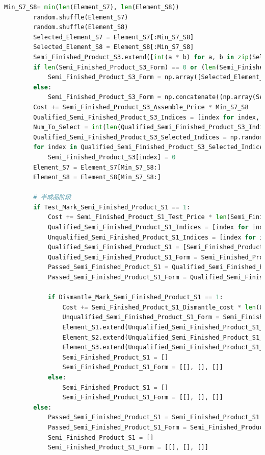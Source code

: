 \documentclass[withoutpreface,bwprint]{cumcmthesis} %
\begin{document}
\begin{appendices}
\begin{lstlisting}[language=python]
		Min_S7_S8= min(len(Element_S7), len(Element_S8))
		random.shuffle(Element_S7)
		random.shuffle(Element_S8)
		Selected_Element_S7 = Element_S7[:Min_S7_S8]
		Selected_Element_S8 = Element_S8[:Min_S7_S8]
		Semi_Finished_Product_S3.extend([int(a * b) for a, b in zip(Selected_Element_S7, Selected_Element_S8)])
		if len(Semi_Finished_Product_S3_Form) == 0 or (len(Semi_Finished_Product_S3_Form) == 2 and all(len(sublist) == 0 for sublist in Semi_Finished_Product_S3_Form)):
			Semi_Finished_Product_S3_Form = np.array([Selected_Element_S7, Selected_Element_S8])
		else:
			Semi_Finished_Product_S3_Form = np.concatenate((np.array(Semi_Finished_Product_S3_Form), np.array([Selected_Element_S7, Selected_Element_S8])), axis=1)
		Cost += Semi_Finished_Product_S3_Assemble_Price * Min_S7_S8
		Qualified_Semi_Finished_Product_S3_Indices = [index for index, value in enumerate(Semi_Finished_Product_S3) if value == 1]
		Num_To_Select = int(len(Qualified_Semi_Finished_Product_S3_Indices) * Perturbed_Semi_Finished_Product_S3_Defect_Rate)
		Qualified_Semi_Finished_Product_S3_Selected_Indices = np.random.choice(Qualified_Semi_Finished_Product_S3_Indices, size=Num_To_Select, replace=False)
		for index in Qualified_Semi_Finished_Product_S3_Selected_Indices:
			Semi_Finished_Product_S3[index] = 0
		Element_S7 = Element_S7[Min_S7_S8:]
		Element_S8 = Element_S8[Min_S7_S8:]
	
		# 半成品阶段
		if Test_Mark_Semi_Finished_Product_S1 == 1:
			Cost += Semi_Finished_Product_S1_Test_Price * len(Semi_Finished_Product_S1)
			Qualified_Semi_Finished_Product_S1_Indices = [index for index, value in enumerate(Semi_Finished_Product_S1) if value == 1]
			Unqualified_Semi_Finished_Product_S1_Indices = [index for index, value in enumerate(Semi_Finished_Product_S1) if value == 0]
			Qualified_Semi_Finished_Product_S1 = [Semi_Finished_Product_S1[i] for i in range(len(Semi_Finished_Product_S1)) if i in Qualified_Semi_Finished_Product_S1_Indices]
			Qualified_Semi_Finished_Product_S1_Form = Semi_Finished_Product_S1_Form[:, Qualified_Semi_Finished_Product_S1_Indices]
			Passed_Semi_Finished_Product_S1 = Qualified_Semi_Finished_Product_S1
			Passed_Semi_Finished_Product_S1_Form = Qualified_Semi_Finished_Product_S1_Form
	
			if Dismantle_Mark_Semi_Finished_Product_S1 == 1:
				Cost += Semi_Finished_Product_S1_Dismantle_cost * len(Unqualified_Semi_Finished_Product_S1_Indices)
				Unqualified_Semi_Finished_Product_S1_Form = Semi_Finished_Product_S1_Form[:, Unqualified_Semi_Finished_Product_S1_Indices]
				Element_S1.extend(Unqualified_Semi_Finished_Product_S1_Form[0])
				Element_S2.extend(Unqualified_Semi_Finished_Product_S1_Form[1])
				Element_S3.extend(Unqualified_Semi_Finished_Product_S1_Form[2])
				Semi_Finished_Product_S1 = []
				Semi_Finished_Product_S1_Form = [[], [], []]
			else:
				Semi_Finished_Product_S1 = []
				Semi_Finished_Product_S1_Form = [[], [], []]
		else:
			Passed_Semi_Finished_Product_S1 = Semi_Finished_Product_S1
			Passed_Semi_Finished_Product_S1_Form = Semi_Finished_Product_S1_Form
			Semi_Finished_Product_S1 = []
			Semi_Finished_Product_S1_Form = [[], [], []]
	

\end{lstlisting}
\end{appendices}
\end{document}
